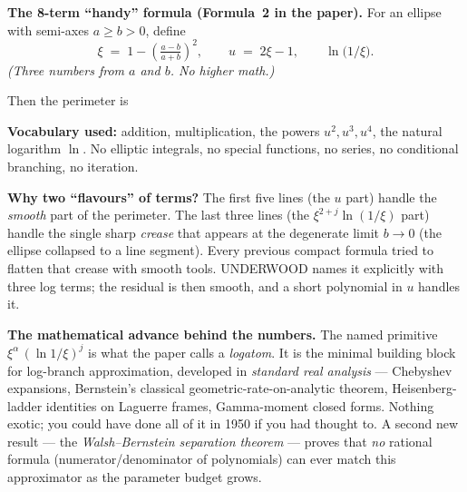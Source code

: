\documentclass[10pt,landscape]{article}
\begin{document}
\noindent
\begin{minipage}[t]{0.49\textwidth}
\small

\textbf{The 8-term ``handy'' formula (Formula~2 in the paper).}
For an ellipse with semi-axes $a \ge b > 0$, define
\[
  \xi \;=\; 1 - \left(\tfrac{a-b}{a+b}\right)^{\!2},
  \qquad
  u \;=\; 2\xi - 1,
  \qquad
  \ln\!\bigl(1/\xi\bigr).
\]
\emph{(Three numbers from $a$ and $b$. No higher math.)}

Then the perimeter is

\medskip
\noindent
{}

\medskip
\textbf{Vocabulary used:} addition, multiplication, the powers
$u^2, u^3, u^4$, the natural logarithm $\ln$.  No elliptic integrals,
no special functions, no series, no conditional branching, no
iteration.

\medskip
\textbf{Why two ``flavours'' of terms?}  The first five lines (the
$u$ part) handle the \emph{smooth} part of the perimeter.  The last
three lines (the $\xi^{2+j}\ln(1/\xi)$ part) handle the single sharp
\emph{crease} that appears at the degenerate limit $b \to 0$ (the
ellipse collapsed to a line segment).  Every previous compact
formula tried to flatten that crease with smooth tools.  UNDERWOOD
names it explicitly with three log terms; the residual is then
smooth, and a short polynomial in $u$ handles it.

\medskip
\textbf{The mathematical advance behind the numbers.}  The named
primitive $\xi^{\alpha}\,(\ln 1/\xi)^{j}$ is what the paper calls a
\emph{logatom}.  It is the minimal building block for log-branch
approximation, developed in \emph{standard real analysis} ---
Chebyshev expansions, Bernstein's classical
geometric-rate-on-analytic theorem, Heisenberg-ladder identities on
Laguerre frames, Gamma-moment closed forms.  Nothing exotic; you
could have done all of it in 1950 if you had thought to. A second
new result --- the \emph{Walsh--Bernstein separation theorem} ---
proves that \emph{no} rational formula (numerator/denominator of
polynomials) can ever match this approximator as the parameter
budget grows.

\end{minipage}\hfill
\end{document}
